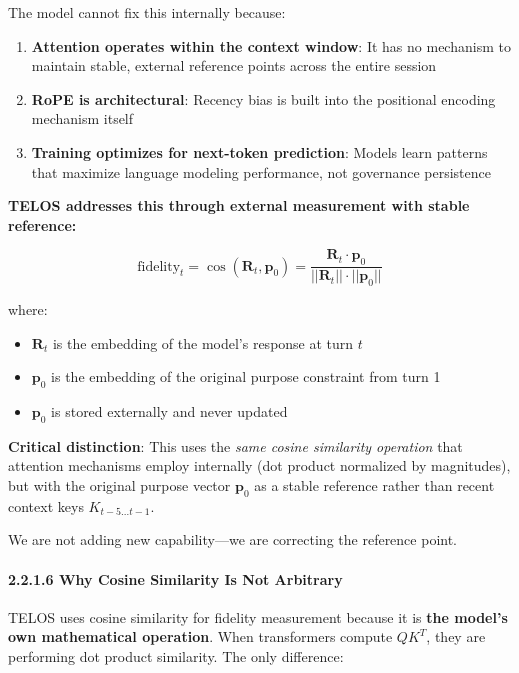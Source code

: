 The model cannot fix this internally because:

\begin{enumerate}
\def\labelenumi{\arabic{enumi}.}
\tightlist
\item
  \textbf{Attention operates within the context window}: It has no
  mechanism to maintain stable, external reference points across the
  entire session
\item
  \textbf{RoPE is architectural}: Recency bias is built into the
  positional encoding mechanism itself
\item
  \textbf{Training optimizes for next-token prediction}: Models learn
  patterns that maximize language modeling performance, not governance
  persistence
\end{enumerate}

\textbf{TELOS addresses this through external measurement with stable
reference:}

\[\text{fidelity}_t = \cos(\mathbf{R}_t, \mathbf{p}_0) = \frac{\mathbf{R}_t \cdot \mathbf{p}_0}{||\mathbf{R}_t|| \cdot ||\mathbf{p}_0||}\]

where:

\begin{itemize}
\tightlist
\item
  \(\mathbf{R}_t\) is the embedding of the model's response at turn
  \(t\)
\item
  \(\mathbf{p}_0\) is the embedding of the original purpose constraint
  from turn 1
\item
  \(\mathbf{p}_0\) is stored externally and never updated
\end{itemize}

\textbf{Critical distinction}: This uses the \emph{same cosine
similarity operation} that attention mechanisms employ internally (dot
product normalized by magnitudes), but with the original purpose vector
\(\mathbf{p}_0\) as a stable reference rather than recent context keys
\(K_{t-5...t-1}\).

We are not adding new capability---we are correcting the reference
point.

\paragraph{2.2.1.6 Why Cosine Similarity Is Not
Arbitrary}\label{why-cosine-similarity-is-not-arbitrary}

TELOS uses cosine similarity for fidelity measurement because it is
\textbf{the model's own mathematical operation}. When transformers
compute \(QK^T\), they are performing dot product similarity. The only
difference:

